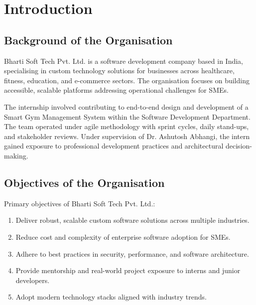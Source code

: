 \documentclass[
  12pt,
  a4paperpaper,
]{report}
\providecommand{\tightlist}{%
  \setlength{\itemsep}{0pt}\setlength{\parskip}{0pt}\setlength{\topsep}{2pt}\setlength{\partopsep}{0pt}}
\begin{document}
\cleardoublepage
{}
\setcounter{page}{1}
\chapter{Introduction}\label{introduction}


\section{Background of the
Organisation}\label{background-of-the-organisation}

Bharti Soft Tech Pvt. Ltd. is a software development company based in India, specialising in custom technology solutions for businesses across healthcare, fitness, education, and e-commerce sectors. The organisation focuses on building accessible, scalable platforms addressing operational challenges for SMEs.

The internship involved contributing to end-to-end design and development of a Smart Gym Management System within the Software Development Department. The team operated under agile methodology with sprint cycles, daily stand-ups, and stakeholder reviews. Under supervision of Dr. Ashutosh Abhangi, the intern gained exposure to professional development practices and architectural decision-making.


\section{Objectives of the
Organisation}\label{objectives-of-the-organisation}

Primary objectives of Bharti Soft Tech Pvt. Ltd.:

\begin{enumerate}
\def\labelenumi{\arabic{enumi}.}
\tightlist
\item
  Deliver robust, scalable custom software solutions across multiple industries.
\item
  Reduce cost and complexity of enterprise software adoption for SMEs.
\item
  Adhere to best practices in security, performance, and software architecture.
\item
  Provide mentorship and real-world project exposure to interns and junior developers.
\item
  Adopt modern technology stacks aligned with industry trends.
\end{enumerate}
\end{document}
